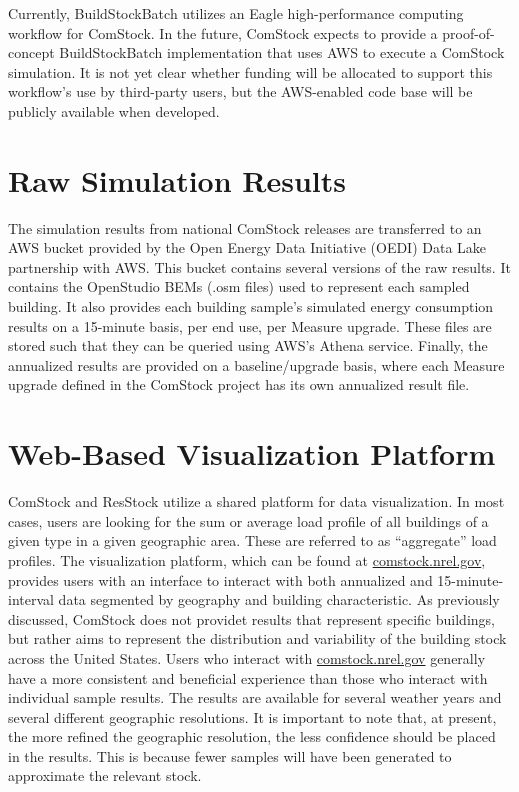 Currently, BuildStockBatch utilizes an Eagle high-performance computing workflow for ComStock. In the future, ComStock expects to provide a proof-of-concept BuildStockBatch implementation that uses AWS to execute a ComStock simulation. It is not yet clear whether funding will be allocated to support this workflow's use by third-party users, but the AWS-enabled code base will be publicly available when developed.

\section{Raw Simulation Results}
\label{rawsimulationresults}
The simulation results from national ComStock releases are transferred to an AWS bucket provided by the Open Energy Data Initiative (OEDI) Data Lake partnership with AWS. This bucket contains several versions of the raw results. It contains the OpenStudio BEMs (.osm files) used to represent each sampled building. It also provides each building sample's simulated energy consumption results on a 15-minute basis, per end use, per Measure upgrade. These files are stored such that they can be queried using AWS's Athena service. Finally, the annualized results are provided on a baseline/upgrade basis, where each Measure upgrade defined in the ComStock project has its own annualized result file.

\section{Web-Based Visualization Platform}
\label{dataviewer}
ComStock and ResStock utilize a shared platform for data visualization. In most cases, users are looking for the sum or average load profile of all buildings of a given type in a given geographic area. These are referred to as ``aggregate'' load profiles. The visualization platform, which can be found at \href{comstock.nrel.gov}{comstock.nrel.gov}, provides users with an interface to interact with both annualized and 15-minute-interval data segmented by geography and building characteristic. As previously discussed, ComStock does not providet results that represent specific buildings, but rather aims to represent the distribution and variability of the building stock across the United States. Users who interact with \href{comstock.nrel.gov}{comstock.nrel.gov} generally have a more consistent and beneficial experience than those who interact with individual sample results. The results are available for several weather years and several different geographic resolutions. It is important to note that, at present, the more refined the geographic resolution, the less confidence should be placed in the results. This is because fewer samples will have been generated to approximate the relevant stock.